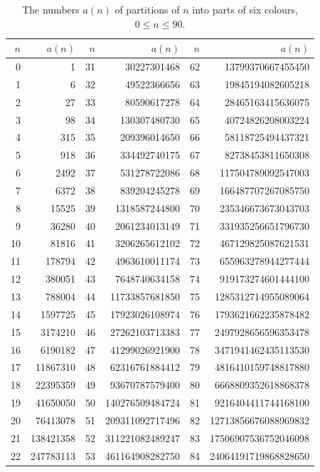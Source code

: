 \documentclass[11pt]{amsart}
\theoremstyle{definition}
\begin{document}
\begin{table}[H]\centering\footnotesize
\caption{The numbers $a(n)$ of partitions of $n$ into parts of six colours, $0\le n\le 90$.}\label{tab:a}
\begin{tabular}{@{}rr@{\qquad}rr@{\qquad}rr@{}}\toprule
$n$ & $a(n)$ & $n$ & $a(n)$ & $n$ & $a(n)$\\\midrule
0 & 1 & 31 & 30227301468 & 62 & 13799370667455450\\
1 & 6 & 32 & 49522366656 & 63 & 19845194082605218\\
2 & 27 & 33 & 80590617278 & 64 & 28465163415636075\\
3 & 98 & 34 & 130307480730 & 65 & 40724826208003224\\
4 & 315 & 35 & 209396014650 & 66 & 58118725494437321\\
5 & 918 & 36 & 334492740175 & 67 & 82738453811650308\\
6 & 2492 & 37 & 531278722086 & 68 & 117504789092547003\\
7 & 6372 & 38 & 839204245278 & 69 & 166487707267085750\\
8 & 15525 & 39 & 1318587244800 & 70 & 235346673673043703\\
9 & 36280 & 40 & 2061234013149 & 71 & 331935256651796730\\
10 & 81816 & 41 & 3206265612102 & 72 & 467129825087621531\\
11 & 178794 & 42 & 4963610011174 & 73 & 655963278944277444\\
12 & 380051 & 43 & 7648740634158 & 74 & 919173274601444100\\
13 & 788004 & 44 & 11733857681850 & 75 & 1285312714955089064\\
14 & 1597725 & 45 & 17923026108974 & 76 & 1793621662235878482\\
15 & 3174210 & 46 & 27262103713383 & 77 & 2497928656596353478\\
16 & 6190182 & 47 & 41299026921900 & 78 & 3471941462435113530\\
17 & 11867310 & 48 & 62316761884412 & 79 & 4816410159748817880\\
18 & 22395359 & 49 & 93670787579400 & 80 & 6668809352618868378\\
19 & 41650050 & 50 & 140276509484724 & 81 & 9216404411744168100\\
20 & 76413078 & 51 & 209311092717496 & 82 & 12713856676088969832\\
21 & 138421358 & 52 & 311221082489247 & 83 & 17506907536752046098\\
22 & 247783113 & 53 & 461164908282750 & 84 & 24064191719868828650\\

\end{tabular}
\end{table}
\end{document}
